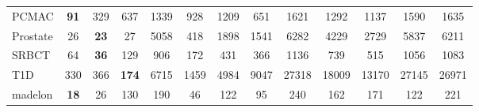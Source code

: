 \begin{table}[t]
{\begin{tabular}{lcccccccccccc}
PCMAC            & \textbf{91} & 329 & 637 & 1339 & 928 & 1209 & 651 & 1621 & 1292 & 1137 & 1590 & 1635 \\
Prostate         & 26 & \textbf{23} & 27 & 5058 & 418 & 1898 & 1541 & 6282 & 4229 & 2729 & 5837 & 6211 \\
SRBCT            & 64 & \textbf{36} & 129 & 906 & 172 & 431 & 366 & 1136 & 739 & 515 & 1056 & 1083 \\
T1D              & 330 & 366 & \textbf{174} & 6715 & 1459 & 4984 & 9047 & 27318 & 18009 & 13170 & 27145 & 26971 \\
madelon          & \textbf{18} & 26 & 130 & 190 & 46 & 122 & 95 & 240 & 162 & 171 & 122 & 221 \\
\bottomrule
\end{tabular}
}
\end{table}